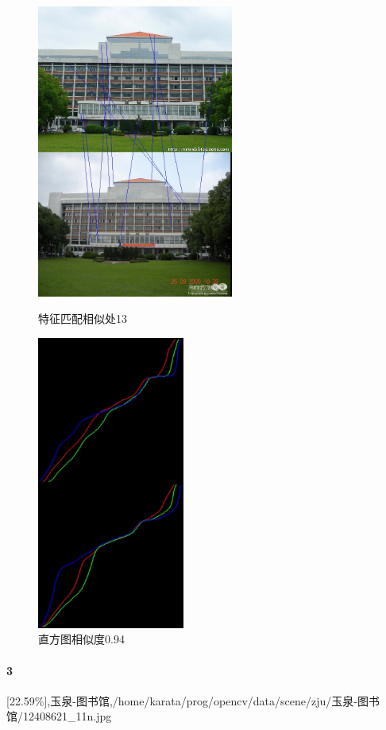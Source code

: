 \begin{figure}[htb]
\begin{minipage}[t]{0.5\linewidth}
\centering
\includegraphics[height=3.8in]{玉泉图书馆.jpg.d/im2sift.jpg}
\caption{特征匹配相似处13}
\label{fig:side:a}
\end{minipage}%
\begin{minipage}[t]{0.5\linewidth}
\centering
\includegraphics[height=3.8in]{玉泉图书馆.jpg.d/im2hist2.jpg}
\caption{直方图相似度0.94}
\label{fig:side:a}
\end{minipage}%
\end{figure}

\paragraph{3}
[22.59\%],玉泉-图书馆,/home/karata/prog/opencv/data/scene/zju/玉泉-图书馆/12408621_11n.jpg

